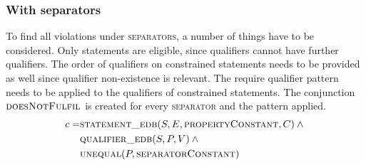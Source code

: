 \documentclass[hyperref,bachelorofscience,fleqn]{cgvpub}
\begin{document}
\subsubsection{With separators}\label{subsubsec_single_value_with_separators}
To find all violations under \textsc{separators}, a number of things have to be considered. Only statements are eligible, since qualifiers cannot have further qualifiers. The order of qualifiers on constrained statements needs to be provided as well since qualifier non-existence is relevant. The require qualifier pattern needs to be applied to the qualifiers of constrained statements. The conjunction \(\textsc{doesNotFulfil}\) is created for every \textsc{separator} and the pattern applied.
\begin{equation}
\begin{split}
c = &\textsc{statement\_edb}(S, E, \textsc{propertyConstant}, C) \wedge{} \\
&\textsc{qualifier\_edb}(S, P, V) \wedge{} \\
&\textsc{unequal}(P, \textsc{separatorConstant})
\end{split}
\end{equation}
\end{document}
